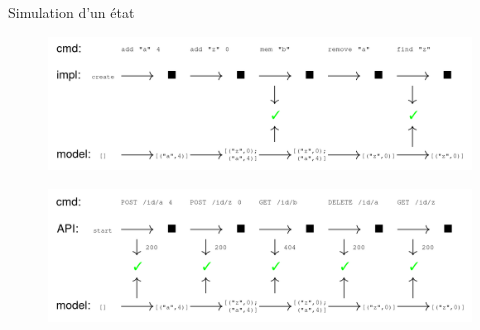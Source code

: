 \begin{frame}{Simulation d'un état}

\begin{figure}
\centering
\includegraphics[width=\textwidth]{slides/images/qcheck_state.png}
\end{figure}
\begin{figure}
\centering
\includegraphics[width=\textwidth]{slides/images/qcheck_state_2.png}
\end{figure}

\end{frame}